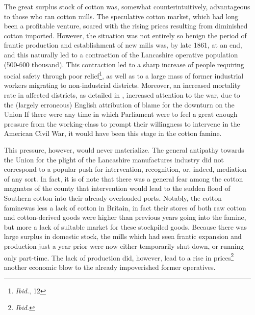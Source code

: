 The great surplus stock of cotton was, somewhat counterintuitively, advantageous to those who ran cotton mills. The speculative cotton market,
which had long been a profitable venture, soared with the rising prices resulting from diminished cotton imported. However, the situation
was not entirely so benign \textemdash the period of frantic production and establishment of new mills was, by late 1861, at an end, and this naturally led to
a contraction of the Lancashire operative population (500-600 thousand\Autocite*[Vol.II, p.13]{adamsBritainAmericanWar1925}). This contraction led to a sharp
increase of people requiring social safety through \flq poor relief\frq\footnote{\textit{Ibid.}, 12},
as well as to a large mass of former industrial workers migrating to non-industrial districts\autocite{arthi2022recessions}. Moreover, an increased mortality rate
in affected districts, as detailed in , increased attention to the war, due to the
(largely erroneous) English attribution of blame for the downturn on the Union\autocite[229]{arnoldHistoryCotton1864} \textemdash
If there were any time in which Parliament were to feel a great enough pressure from the working-class to prompt their willingness to intervene in the
American Civil War, it would have been this stage in the cotton famine.

This pressure, however, would never materialize. The general antipathy towards the Union for the plight of the Lancashire manufactures industry did not correspond to a popular push for intervention, recognition, or, indeed, mediation of any sort. In fact, it is of note that there was a general fear among the cotton magnates of the county that intervention would lead to the sudden flood of Southern cotton into their already overloaded ports\Autocite[Vol.II, p.11]{adamsBritainAmericanWar1925}. Notably, the \flq cotton famine\frq was less a lack of cotton in Britain, in fact their stores of both raw cotton and cotton-derived goods were higher than previous years going into the famine, but more a lack of suitable market for these stockpiled goods. Because there was large surplus in domestic stock, the mills which had seen frantic expansion and production just a year prior were now either temporarily shut down, or running only part-time. The lack of production did, however, lead to a rise in prices\footnote{\textit{Ibid.}} \textemdash another economic blow to the already impoverished former operatives.

